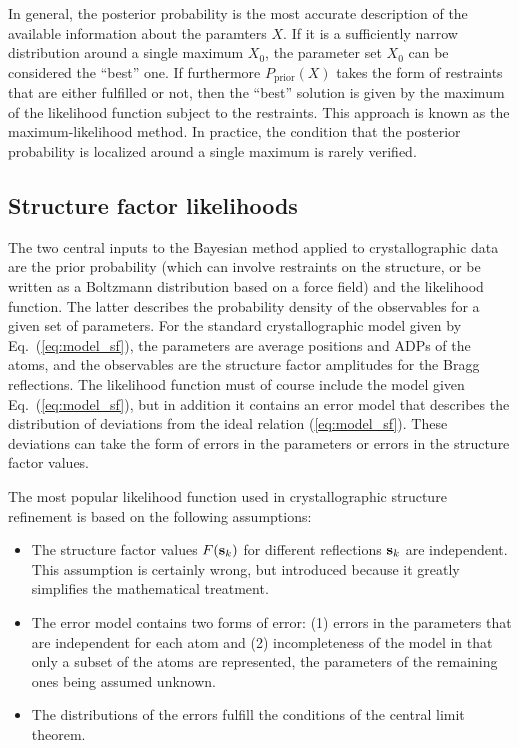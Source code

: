 \documentclass[12pt]{article}
\newcommand{\vect}[1]{{\bf #1}}
\newcommand{\vs}{\vect{s}}
\begin{document}
\begin{sloppy}
In general, the posterior probability is the most accurate description
of the available information about the paramters $X$. If it is a
sufficiently narrow distribution around a single maximum $X_0$, the
parameter set $X_0$ can be considered the ``best'' one. If furthermore
$P_{\mbox{prior}}(X)$ takes the form of restraints that are either
fulfilled or not, then the ``best'' solution is given by the maximum
of the likelihood function subject to the restraints. This approach is
known as the maximum-likelihood method. In practice, the condition that
the posterior probability is localized around a single maximum is
rarely verified.

\subsection{Structure factor likelihoods}

The two central inputs to the Bayesian method applied to
crystallographic data are the prior probability (which can involve
restraints on the structure, or be written as a Boltzmann distribution
based on a force field) and the likelihood function. The latter
describes the probability density of the observables for a given set
of parameters. For the standard crystallographic model given by
Eq.~(\ref{eq:model_sf}), the parameters are average positions and ADPs
of the atoms, and the observables are the structure factor amplitudes
for the Bragg reflections. The likelihood function must of course
include the model given Eq.~(\ref{eq:model_sf}), but in addition it
contains an error model that describes the distribution of deviations
from the ideal relation (\ref{eq:model_sf}). These deviations can take
the form of errors in the parameters or errors in the structure factor
values.

The most popular likelihood function used in crystallographic structure
refinement is based on the following assumptions:
\begin{itemize}
\item The structure factor values $F(\vs_k)$ for different reflections
  $\vs_k$ are independent. This assumption is certainly wrong, but
  introduced because it greatly simplifies the mathematical treatment.
\item The error model contains two forms of error: (1) errors in the
  parameters that are independent for each atom and (2) incompleteness
  of the model in that only a subset of the atoms are represented,
  the parameters of the remaining ones being assumed unknown.
\item The distributions of the errors fulfill the conditions of the
  central limit theorem.
\end{itemize}


\end{sloppy}
\end{document}
